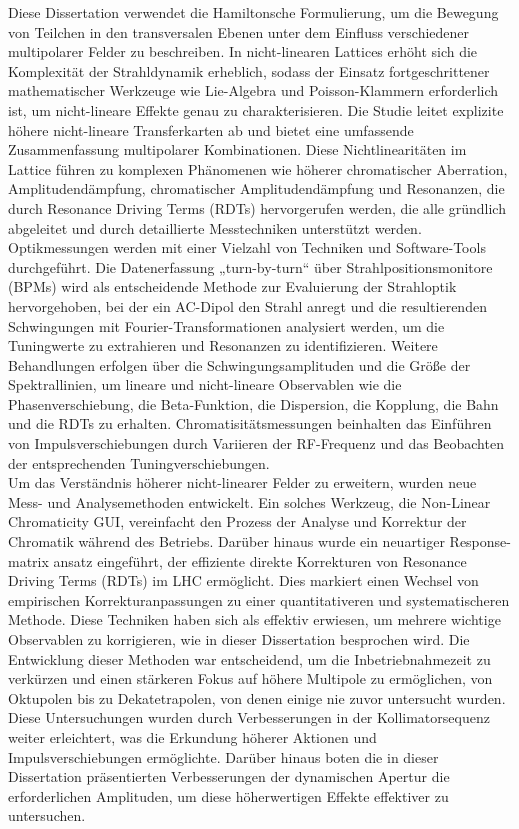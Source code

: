 {%
Diese Dissertation verwendet die Hamiltonsche Formulierung, um die Bewegung von Teilchen in den
transversalen Ebenen unter dem Einfluss verschiedener multipolarer Felder zu beschreiben. In
nicht-linearen Lattices erhöht sich die Komplexität der Strahldynamik erheblich, sodass der Einsatz
fortgeschrittener mathematischer Werkzeuge wie Lie-Algebra und Poisson-Klammern erforderlich ist, um
nicht-lineare Effekte genau zu charakterisieren. Die Studie leitet explizite höhere nicht-lineare
Transferkarten ab und bietet eine umfassende Zusammenfassung multipolarer Kombinationen. Diese
Nichtlinearitäten im Lattice führen zu komplexen Phänomenen wie höherer chromatischer Aberration,
Amplitudendämpfung, chromatischer Amplitudendämpfung und Resonanzen, die durch Resonance Driving
Terms (RDTs) hervorgerufen werden, die alle gründlich abgeleitet und durch detaillierte
Messtechniken unterstützt werden.
\\
\indent
Optikmessungen werden mit einer Vielzahl von Techniken und Software-Tools durchgeführt. Die
Datenerfassung „turn-by-turn“ über Strahlpositionsmonitore (BPMs) wird als entscheidende Methode zur
Evaluierung der Strahloptik hervorgehoben, bei der ein AC-Dipol den Strahl anregt und die
resultierenden Schwingungen mit Fourier-Transformationen analysiert werden, um die Tuningwerte zu
extrahieren und Resonanzen zu identifizieren. Weitere Behandlungen erfolgen über die
Schwingungsamplituden und die Größe der Spektrallinien, um lineare und nicht-lineare Observablen wie
die Phasenverschiebung, die Beta-Funktion, die Dispersion, die Kopplung, die Bahn und die RDTs zu
erhalten. Chromatisitätsmessungen beinhalten das Einführen von Impulsverschiebungen durch Variieren
der RF-Frequenz und das Beobachten der entsprechenden Tuningverschiebungen.
\\
\indent
Um das Verständnis höherer nicht-linearer Felder zu erweitern, wurden neue Mess- und Analysemethoden
entwickelt. Ein solches Werkzeug, die Non-Linear Chromaticity GUI, vereinfacht den Prozess der
Analyse und Korrektur der Chromatik während des Betriebs. Darüber hinaus wurde ein neuartiger
Response-matrix ansatz eingeführt, der effiziente direkte Korrekturen von Resonance Driving Terms
(RDTs) im LHC ermöglicht. Dies markiert einen Wechsel von empirischen Korrekturanpassungen zu einer
quantitativeren und systematischeren Methode. Diese Techniken haben sich als effektiv erwiesen, um
mehrere wichtige Observablen zu korrigieren, wie in dieser Dissertation besprochen wird. Die
Entwicklung dieser Methoden war entscheidend, um die Inbetriebnahmezeit zu verkürzen und einen
stärkeren Fokus auf höhere Multipole zu ermöglichen, von Oktupolen bis zu Dekatetrapolen, von denen
einige nie zuvor untersucht wurden. Diese Untersuchungen wurden durch Verbesserungen in der
Kollimatorsequenz weiter erleichtert, was die Erkundung höherer Aktionen und Impulsverschiebungen
ermöglichte. Darüber hinaus boten die in dieser Dissertation präsentierten Verbesserungen der
dynamischen Apertur die erforderlichen Amplituden, um diese höherwertigen Effekte effektiver zu
untersuchen.

}
